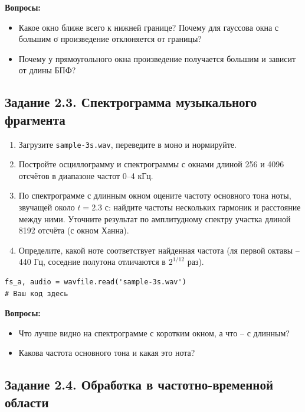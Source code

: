 \documentclass[12pt,a4paper,openany]{book}
\providecommand{\tightlist}{\setlength{\itemsep}{0pt}\setlength{\parskip}{0pt}}
\begin{document}
\textbf{Вопросы:}

\begin{itemize}
\tightlist
\item
  Какое окно ближе всего к нижней границе? Почему для гауссова окна с большим σ произведение отклоняется от границы?
\item
  Почему у прямоугольного окна произведение получается большим и зависит от длины БПФ?
\end{itemize}

\subsection*{Задание 2.3. Спектрограмма музыкального фрагмента}

\begin{enumerate}
\def\labelenumi{\arabic{enumi}.}
\tightlist
\item
  Загрузите \texttt{sample-3s.\allowbreak{}wav}, переведите в моно и нормируйте.
\item
  Постройте осциллограмму и спектрограммы с окнами длиной 256 и 4096 отсчётов в диапазоне частот 0--4 кГц.
\item
  По спектрограмме с длинным окном оцените частоту основного тона ноты, звучащей около \(t = 2.3\) с: найдите частоты нескольких гармоник и расстояние между ними. Уточните результат по амплитудному спектру участка длиной 8192 отсчёта (с окном Ханна).
\item
  Определите, какой ноте соответствует найденная частота (ля первой октавы -- 440 Гц, соседние полутона отличаются в \(2^{1/12}\) раз).
\end{enumerate}

\begin{Verbatim}[fontsize=\small, breaklines, breakanywhere, frame=single, framesep=2mm]
fs_a, audio = wavfile.read('sample-3s.wav')
# Ваш код здесь
\end{Verbatim}

\textbf{Вопросы:}

\begin{itemize}
\tightlist
\item
  Что лучше видно на спектрограмме с коротким окном, а что -- с длинным?
\item
  Какова частота основного тона и какая это нота?
\end{itemize}

\subsection*{Задание 2.4. Обработка в частотно-временной области}
\end{document}
